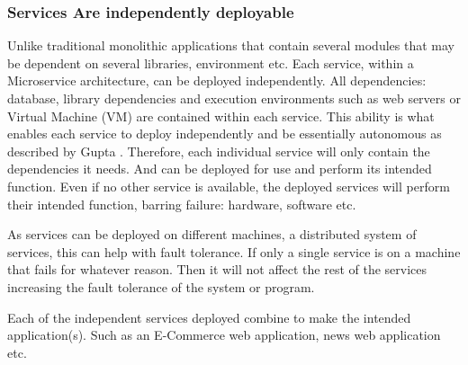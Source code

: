 \subsubsection{Services Are independently deployable}
Unlike traditional monolithic applications that contain several modules that may be dependent on several libraries, environment etc. Each service, within a Microservice architecture, can be deployed independently. All dependencies: database, library dependencies and execution environments such as web servers or Virtual Machine (VM) are contained within each service. This ability is what enables each service to deploy independently and be essentially autonomous as described by Gupta \cite{GuptaMSA}. Therefore, each individual service will only contain the dependencies it needs. And can be deployed for use and perform its intended function. Even if no other service is available, the deployed services will perform their intended function, barring failure: hardware, software etc.

As services can be deployed on different machines, a distributed system of services, this can help with fault tolerance. If only a single service is on a machine that fails for whatever reason. Then it will not affect the rest of the services increasing the fault tolerance of the system or program.

Each of the independent services deployed combine to make the intended application(s). Such as an E-Commerce web application, news web application etc.

